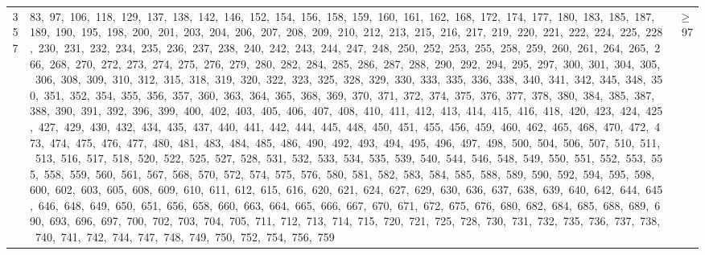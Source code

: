\begin{longtable}{c|p{}|r}
357 & 83,\ 97,\ 106,\ 118,\ 129,\ 137,\ 138,\ 142,\ 146,\ 152,\ 154,\ 156,\ 158,\ 159,\ 160,\ 161,\ 162,\ 168,\ 172,\ 174,\ 177,\ 180,\ 183,\ 185,\ 187,\ 189,\ 190,\ 195,\ 198,\ 200,\ 201,\ 203,\ 204,\ 206,\ 207,\ 208,\ 209,\ 210,\ 212,\ 213,\ 215,\ 216,\ 217,\ 219,\ 220,\ 221,\ 222,\ 224,\ 225,\ 228,\ 230,\ 231,\ 232,\ 234,\ 235,\ 236,\ 237,\ 238,\ 240,\ 242,\ 243,\ 244,\ 247,\ 248,\ 250,\ 252,\ 253,\ 255,\ 258,\ 259,\ 260,\ 261,\ 264,\ 265,\ 266,\ 268,\ 270,\ 272,\ 273,\ 274,\ 275,\ 276,\ 279,\ 280,\ 282,\ 284,\ 285,\ 286,\ 287,\ 288,\ 290,\ 292,\ 294,\ 295,\ 297,\ 300,\ 301,\ 304,\ 305,\ 306,\ 308,\ 309,\ 310,\ 312,\ 315,\ 318,\ 319,\ 320,\ 322,\ 323,\ 325,\ 328,\ 329,\ 330,\ 333,\ 335,\ 336,\ 338,\ 340,\ 341,\ 342,\ 345,\ 348,\ 350,\ 351,\ 352,\ 354,\ 355,\ 356,\ 357,\ 360,\ 363,\ 364,\ 365,\ 368,\ 369,\ 370,\ 371,\ 372,\ 374,\ 375,\ 376,\ 377,\ 378,\ 380,\ 384,\ 385,\ 387,\ 388,\ 390,\ 391,\ 392,\ 396,\ 399,\ 400,\ 402,\ 403,\ 405,\ 406,\ 407,\ 408,\ 410,\ 411,\ 412,\ 413,\ 414,\ 415,\ 416,\ 418,\ 420,\ 423,\ 424,\ 425,\ 427,\ 429,\ 430,\ 432,\ 434,\ 435,\ 437,\ 440,\ 441,\ 442,\ 444,\ 445,\ 448,\ 450,\ 451,\ 455,\ 456,\ 459,\ 460,\ 462,\ 465,\ 468,\ 470,\ 472,\ 473,\ 474,\ 475,\ 476,\ 477,\ 480,\ 481,\ 483,\ 484,\ 485,\ 486,\ 490,\ 492,\ 493,\ 494,\ 495,\ 496,\ 497,\ 498,\ 500,\ 504,\ 506,\ 507,\ 510,\ 511,\ 513,\ 516,\ 517,\ 518,\ 520,\ 522,\ 525,\ 527,\ 528,\ 531,\ 532,\ 533,\ 534,\ 535,\ 539,\ 540,\ 544,\ 546,\ 548,\ 549,\ 550,\ 551,\ 552,\ 553,\ 555,\ 558,\ 559,\ 560,\ 561,\ 567,\ 568,\ 570,\ 572,\ 574,\ 575,\ 576,\ 580,\ 581,\ 582,\ 583,\ 584,\ 585,\ 588,\ 589,\ 590,\ 592,\ 594,\ 595,\ 598,\ 600,\ 602,\ 603,\ 605,\ 608,\ 609,\ 610,\ 611,\ 612,\ 615,\ 616,\ 620,\ 621,\ 624,\ 627,\ 629,\ 630,\ 636,\ 637,\ 638,\ 639,\ 640,\ 642,\ 644,\ 645,\ 646,\ 648,\ 649,\ 650,\ 651,\ 656,\ 658,\ 660,\ 663,\ 664,\ 665,\ 666,\ 667,\ 670,\ 671,\ 672,\ 675,\ 676,\ 680,\ 682,\ 684,\ 685,\ 688,\ 689,\ 690,\ 693,\ 696,\ 697,\ 700,\ 702,\ 703,\ 704,\ 705,\ 711,\ 712,\ 713,\ 714,\ 715,\ 720,\ 721,\ 725,\ 728,\ 730,\ 731,\ 732,\ 735,\ 736,\ 737,\ 738,\ 740,\ 741,\ 742,\ 744,\ 747,\ 748,\ 749,\ 750,\ 752,\ 754,\ 756,\ 759 & $\ge$ 97 \\

\end{longtable}
